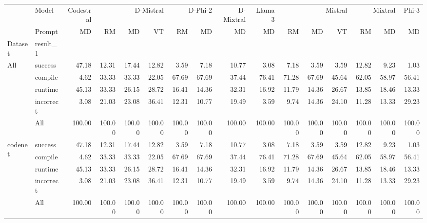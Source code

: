 \begin{tabular}{llrrrrrrrrrrrrrr}
\toprule
 & Model & Codestral & \multicolumn{3}{r}{D-Mistral} & \multicolumn{2}{r}{D-Phi-2} & D-Mixtral & Llama 3 & \multicolumn{3}{r}{Mistral} & \multicolumn{2}{r}{Mixtral} & Phi-3 \\
 & Prompt & MD & RM & MD & VT & RM & MD & MD & MD & RM & MD & VT & RM & MD & MD \\
Dataset & result_1 &  &  &  &  &  &  &  &  &  &  &  &  &  &  \\
\midrule
\multirow[t]{5}{*}{All} & success & 47.18 & 12.31 & 17.44 & 12.82 & 3.59 & 7.18 & 10.77 & 3.08 & 7.18 & 3.59 & 3.59 & 12.82 & 9.23 & 1.03 \\
 & compile & 4.62 & 33.33 & 33.33 & 22.05 & 67.69 & 67.69 & 37.44 & 76.41 & 71.28 & 67.69 & 45.64 & 62.05 & 58.97 & 56.41 \\
 & runtime & 45.13 & 33.33 & 26.15 & 28.72 & 16.41 & 14.36 & 32.31 & 16.92 & 11.79 & 14.36 & 26.67 & 13.85 & 18.46 & 13.33 \\
 & incorrect & 3.08 & 21.03 & 23.08 & 36.41 & 12.31 & 10.77 & 19.49 & 3.59 & 9.74 & 14.36 & 24.10 & 11.28 & 13.33 & 29.23 \\
 & All & 100.00 & 100.00 & 100.00 & 100.00 & 100.00 & 100.00 & 100.00 & 100.00 & 100.00 & 100.00 & 100.00 & 100.00 & 100.00 & 100.00 \\
\cline{1-16}
\multirow[t]{5}{*}{codenet} & success & 47.18 & 12.31 & 17.44 & 12.82 & 3.59 & 7.18 & 10.77 & 3.08 & 7.18 & 3.59 & 3.59 & 12.82 & 9.23 & 1.03 \\
 & compile & 4.62 & 33.33 & 33.33 & 22.05 & 67.69 & 67.69 & 37.44 & 76.41 & 71.28 & 67.69 & 45.64 & 62.05 & 58.97 & 56.41 \\
 & runtime & 45.13 & 33.33 & 26.15 & 28.72 & 16.41 & 14.36 & 32.31 & 16.92 & 11.79 & 14.36 & 26.67 & 13.85 & 18.46 & 13.33 \\
 & incorrect & 3.08 & 21.03 & 23.08 & 36.41 & 12.31 & 10.77 & 19.49 & 3.59 & 9.74 & 14.36 & 24.10 & 11.28 & 13.33 & 29.23 \\
 & All & 100.00 & 100.00 & 100.00 & 100.00 & 100.00 & 100.00 & 100.00 & 100.00 & 100.00 & 100.00 & 100.00 & 100.00 & 100.00 & 100.00 \\
\cline{1-16}
\bottomrule
\end{tabular}
